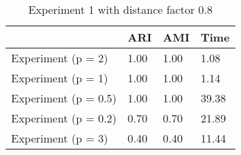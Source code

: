 \begin{table}
\centering
\caption{Experiment 1 with distance factor 0.8}
\begin{tabular}{llll}
\toprule
{} &   ARI &   AMI &   Time \\
\midrule
Experiment (p = 2)   &  1.00 &  1.00 &   1.08 \\
Experiment (p = 1)   &  1.00 &  1.00 &   1.14 \\
Experiment (p = 0.5) &  1.00 &  1.00 &  39.38 \\
Experiment (p = 0.2) &  0.70 &  0.70 &  21.89 \\
Experiment (p = 3)   &  0.40 &  0.40 &  11.44 \\
\bottomrule
\end{tabular}
\end{table}
